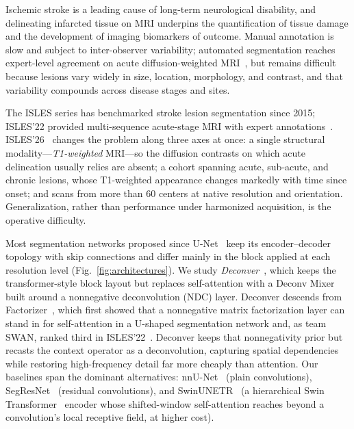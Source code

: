 \documentclass[runningheads,a4paper]{llncs}
\begin{document}
Ischemic stroke is a leading cause of long-term neurological disability, and delineating infarcted tissue on MRI underpins the quantification of tissue damage and the development of imaging biomarkers of outcome. Manual annotation is slow and subject to inter-observer variability; automated segmentation reaches expert-level agreement on acute diffusion-weighted MRI~\cite{de_la_rosa_deepisles_2025}, but remains difficult because lesions vary widely in size, location, morphology, and contrast, and that variability compounds across disease stages and sites.

The ISLES series has benchmarked stroke lesion segmentation since 2015; ISLES'22 provided multi-sequence acute-stage MRI with expert annotations~\cite{hernandez2022isles22}. ISLES'26~\cite{isles26} changes the problem along three axes at once: a single structural modality---\emph{T1-weighted} MRI---so the diffusion contrasts on which acute delineation usually relies are absent; a cohort spanning acute, sub-acute, and chronic lesions, whose T1-weighted appearance changes markedly with time since onset; and scans from more than 60 centers at native resolution and orientation. Generalization, rather than performance under harmonized acquisition, is the operative difficulty.

Most segmentation networks proposed since U-Net~\cite{ronneberger2015unet} keep its encoder--decoder topology with skip connections and differ mainly in the block applied at each resolution level (Fig.~\ref{fig:architectures}). We study \emph{Deconver}~\cite{ashtari2025deconver}, which keeps the transformer-style block layout but replaces self-attention with a Deconv Mixer built around a nonnegative deconvolution (NDC) layer. Deconver descends from Factorizer~\cite{ashtari2023factorizer}, which first showed that a nonnegative matrix factorization layer can stand in for self-attention in a U-shaped segmentation network and, as team SWAN, ranked third in ISLES'22~\cite{de_la_rosa_deepisles_2025}. Deconver keeps that nonnegativity prior but recasts the context operator as a deconvolution, capturing spatial dependencies while restoring high-frequency detail far more cheaply than attention. Our baselines span the dominant alternatives: nnU-Net~\cite{isensee2021nnunet} (plain convolutions), SegResNet~\cite{myronenko2018segresnet} (residual convolutions), and SwinUNETR~\cite{hatamizadeh2022swinunetr} (a hierarchical Swin Transformer~\cite{liu2021swin} encoder whose shifted-window self-attention reaches beyond a convolution's local receptive field, at higher cost).
\end{document}

